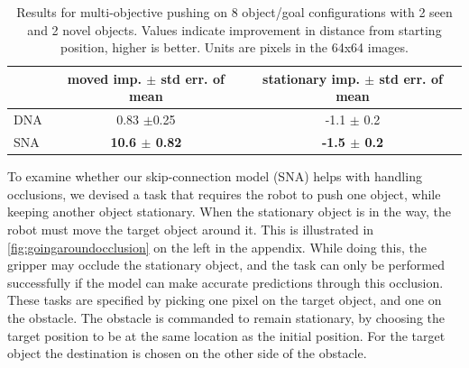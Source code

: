 


\begin{table}
\centering
{\footnotesize
\begin{tabular}{lcc}
	\toprule
         &  \thead{moved imp. \\ $\pm$ std err. of mean} &   \thead{stationary imp. \\ $\pm$ std err. of mean}  \\
         \midrule
  DNA \cite{foresight} & 0.83 $\pm$0.25 &  -1.1 $\pm$ 0.2\\ 
  SNA & \textbf{10.6 $\pm$ 0.82} & \textbf{-1.5 $\pm$ 0.2} \\
  \bottomrule
\end{tabular}
}
\caption{Results for multi-objective pushing on 8 object/goal configurations with 2 seen and 2 novel objects. Values indicate improvement in distance from starting position, higher is better. Units are pixels in the 64x64 images.} 
\label{table:mult_obj}
\end{table}

To examine whether our skip-connection model (SNA) helps with handling occlusions, we devised a task that requires the robot to push one object, while keeping another object stationary. When the stationary object is in the way, the robot must move the target object around it. This is illustrated in  \autoref{fig:goingaroundocclusion} on the left in the appendix. While doing this, the gripper may occlude the stationary object, and the task can only be performed successfully if the model can make accurate predictions through this occlusion. These tasks are specified by picking one pixel on the target object, and one on the obstacle. The obstacle is commanded to remain stationary, by choosing the target position to be at the same location as the initial position. For the target object the destination is chosen on the other side of the obstacle.

